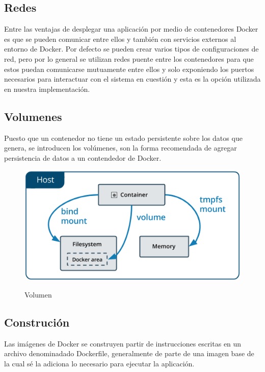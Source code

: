 \subsection{Redes}

Entre las ventajas de desplegar una aplicación por medio de contenedores Docker es que se pueden
comunicar entre ellos y también con servicios externos al entorno de Docker. Por defecto se pueden
crear varios tipos de configuraciones de red, pero por lo general se utilizan redes puente entre
los contenedores para que estos puedan comunicarse mutuamente entre ellos y solo exponiendo los
puertos necesarios para interactuar con el sistema en cuestión y esta es la opción utilizada en
nuestra implementación. \cite{Docker}

\subsection{Volumenes}
Puesto que un contenedor no tiene un estado persistente sobre los datos que genera, se introducen
los volúmenes, son la forma recomendada de agregar persistencia de datos a un contendedor de
Docker.
\cite{Docker}

\begin{figure}[ht]
	\centering
	\includegraphics[width=\textwidth]{imagenes/cap4/docker-volume.png}
	\caption{Volumen}
  \cite{Docker}
	\label{fig:volume_diagram}
\end{figure}

\subsection{Construción}
Las imágenes de Docker se construyen partir de instrucciones escritas en un archivo denominadado
Dockerfile,
generalmente de parte de una imagen base de la cual sé la adiciona lo necesario para ejecutar la
aplicación.
\cite{Docker}

